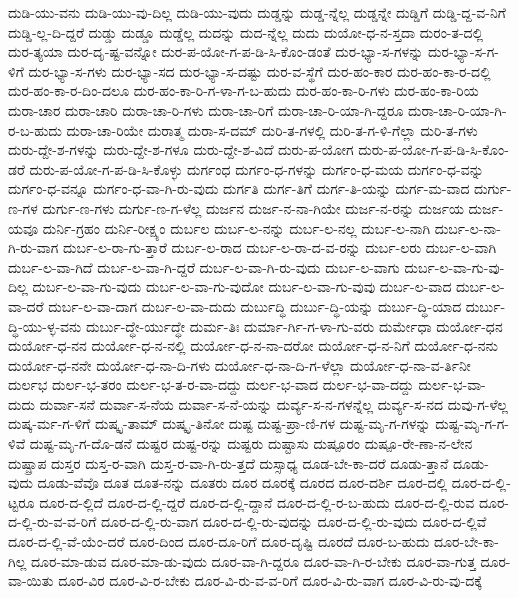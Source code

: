 {ದುಡಿ-ಯು-ವನು
ದುಡಿ-ಯು-ವು-ದಿಲ್ಲ
ದುಡಿ-ಯು-ವುದು
ದುಡ್ಡನ್ನು
ದುಡ್ಡ-ನ್ನೆಲ್ಲ
ದುಡ್ಡನ್ನೇ
ದುಡ್ಡಿಗೆ
ದುಡ್ಡಿ-ದ್ದ-ವ-ನಿಗೆ
ದುಡ್ಡಿ-ಲ್ಲ-ದಿ-ದ್ದರೆ
ದುಡ್ಡು
ದುಡ್ಡೂ
ದುಡ್ಡೆಲ್ಲ
ದುದನ್ನು
ದುದ-ನ್ನೆಲ್ಲ
ದುದು
ದುಯೋ-ಧ-ನ-ಸ್ತದಾ
ದುರಂ-ತ-ದಲ್ಲಿ
ದುರ-ತ್ಯಯಾ
ದುರ-ದೃ-ಷ್ಟ-ವನ್ನೋ
ದುರ-ಪ-ಯೋ-ಗ-ಪ-ಡಿ-ಸಿ-ಕೊಂ-ಡಂತೆ
ದುರ-ಭ್ಯಾ-ಸ-ಗಳನ್ನು
ದುರ-ಭ್ಯಾ-ಸ-ಗ-ಳಿಗೆ
ದುರ-ಭ್ಯಾ-ಸ-ಗಳು
ದುರ-ಭ್ಯಾ-ಸದ
ದುರ-ಭ್ಯಾ-ಸ-ದಷ್ಟು
ದುರ-ವ-ಸ್ಥೆಗೆ
ದುರ-ಹಂ-ಕಾರ
ದುರ-ಹಂ-ಕಾ-ರ-ದಲ್ಲಿ
ದುರ-ಹಂ-ಕಾ-ರ-ದಿಂ-ದಲೂ
ದುರ-ಹಂ-ಕಾ-ರಿ-ಗ-ಳಾ-ಗ-ಬ-ಹುದು
ದುರ-ಹಂ-ಕಾ-ರಿ-ಗಳು
ದುರ-ಹಂ-ಕಾ-ರಿಯ
ದುರಾ-ಚಾರ
ದುರಾ-ಚಾರಿ
ದುರಾ-ಚಾ-ರಿ-ಗಳು
ದುರಾ-ಚಾ-ರಿಗೆ
ದುರಾ-ಚಾ-ರಿ-ಯಾ-ಗಿ-ದ್ದರೂ
ದುರಾ-ಚಾ-ರಿ-ಯಾ-ಗಿ-ರ-ಬ-ಹುದು
ದುರಾ-ಚಾ-ರಿಯೇ
ದುರಾತ್ಮ
ದುರಾ-ಸ-ದಮ್
ದುರಿ-ತ-ಗಳಲ್ಲಿ
ದುರಿ-ತ-ಗ-ಳಿ-ಗೆಲ್ಲಾ
ದುರಿ-ತ-ಗಳು
ದುರು-ದ್ದೇ-ಶ-ಗಳನ್ನು
ದುರು-ದ್ದೇ-ಶ-ಗಳೂ
ದುರು-ದ್ದೇ-ಶ-ವಿದೆ
ದುರು-ಪ-ಯೋಗ
ದುರು-ಪ-ಯೋ-ಗ-ಪ-ಡಿ-ಸಿ-ಕೊಂ-ಡರೆ
ದುರು-ಪ-ಯೋ-ಗ-ಪ-ಡಿ-ಸಿ-ಕೊಳ್ಳು
ದುರ್ಗಂಧ
ದುರ್ಗಂ-ಧ-ಗಳನ್ನು
ದುರ್ಗಂ-ಧ-ಮಯ
ದುರ್ಗಂ-ಧ-ವನ್ನು
ದುರ್ಗಂ-ಧ-ವನ್ನೂ
ದುರ್ಗಂ-ಧ-ವಾ-ಗಿ-ರು-ವುದು
ದುರ್ಗತಿ
ದುರ್ಗ-ತಿಗೆ
ದುರ್ಗ-ತಿ-ಯನ್ನು
ದುರ್ಗ-ಮ-ವಾದ
ದುರ್ಗು-ಣ-ಗಳ
ದುರ್ಗು-ಣ-ಗಳು
ದುರ್ಗು-ಣ-ಗ-ಳೆಲ್ಲ
ದುರ್ಜನ
ದುರ್ಜ-ನ-ನಾ-ಗಿಯೇ
ದುರ್ಜ-ನ-ರನ್ನು
ದುರ್ಜಯ
ದುರ್ಜ-ಯವೂ
ದುರ್ನಿ-ಗ್ರಹಂ
ದುರ್ನಿ-ರೀಕ್ಷ್ಯಂ
ದುರ್ಬಲ
ದುರ್ಬ-ಲ-ನನ್ನು
ದುರ್ಬ-ಲ-ನಲ್ಲ
ದುರ್ಬ-ಲ-ನಾಗಿ
ದುರ್ಬ-ಲ-ನಾ-ಗಿ-ರು-ವಾಗ
ದುರ್ಬ-ಲ-ರಾ-ಗು-ತ್ತಾರೆ
ದುರ್ಬ-ಲ-ರಾದ
ದುರ್ಬ-ಲ-ರಾ-ದ-ವ-ರನ್ನು
ದುರ್ಬ-ಲರು
ದುರ್ಬ-ಲ-ವಾಗಿ
ದುರ್ಬ-ಲ-ವಾ-ಗಿದೆ
ದುರ್ಬ-ಲ-ವಾ-ಗಿ-ದ್ದರೆ
ದುರ್ಬ-ಲ-ವಾ-ಗಿ-ರು-ವುದು
ದುರ್ಬ-ಲ-ವಾಗು
ದುರ್ಬ-ಲ-ವಾ-ಗು-ವು-ದಿಲ್ಲ
ದುರ್ಬ-ಲ-ವಾ-ಗು-ವುದು
ದುರ್ಬ-ಲ-ವಾ-ಗು-ವುದೋ
ದುರ್ಬ-ಲ-ವಾ-ಗು-ವುವು
ದುರ್ಬ-ಲ-ವಾದ
ದುರ್ಬ-ಲ-ವಾ-ದರೆ
ದುರ್ಬ-ಲ-ವಾ-ದಾಗ
ದುರ್ಬ-ಲ-ವಾ-ದುದು
ದುರ್ಬುದ್ಧಿ
ದುರ್ಬು-ದ್ಧಿ-ಯನ್ನು
ದುರ್ಬು-ದ್ಧಿ-ಯಾದ
ದುರ್ಬು-ದ್ಧಿ-ಯು-ಳ್ಳ-ವನು
ದುರ್ಬು-ದ್ಧೇ-ರ್ಯುದ್ಧೇ
ದುರ್ಮ-ತಿಃ
ದುರ್ಮಾ-ರ್ಗಿ-ಗ-ಳಾ-ಗು-ವರು
ದುರ್ಮೇಧಾ
ದುರ್ಯೋ-ಧನ
ದುರ್ಯೋ-ಧ-ನನ
ದುರ್ಯೋ-ಧ-ನ-ನಲ್ಲಿ
ದುರ್ಯೋ-ಧ-ನ-ನಾ-ದರೋ
ದುರ್ಯೋ-ಧ-ನ-ನಿಗೆ
ದುರ್ಯೋ-ಧ-ನನು
ದುರ್ಯೋ-ಧ-ನನೇ
ದುರ್ಯೋ-ಧ-ನಾ-ದಿ-ಗಳು
ದುರ್ಯೋ-ಧ-ನಾ-ದಿ-ಗ-ಳೆಲ್ಲಾ
ದುರ್ಯೋ-ಧ-ನಾ-ವ-ರ್ತಿನೀ
ದುರ್ಲಭ
ದುರ್ಲ-ಭ-ತರಂ
ದುರ್ಲ-ಭ-ತ-ರ-ವಾ-ದದ್ದು
ದುರ್ಲ-ಭ-ವಾದ
ದುರ್ಲ-ಭ-ವಾ-ದದ್ದು
ದುರ್ಲ-ಭ-ವಾ-ದುದು
ದುರ್ವಾ-ಸನೆ
ದುರ್ವಾ-ಸ-ನೆಯ
ದುರ್ವಾ-ಸ-ನೆ-ಯನ್ನು
ದುರ್ವ್ಯ-ಸ-ನ-ಗಳನ್ನೆಲ್ಲ
ದುರ್ವ್ಯ-ಸ-ನದ
ದುವು-ಗ-ಳೆಲ್ಲ
ದುಷ್ಕ-ರ್ಮ-ಗ-ಳಿಗೆ
ದುಷ್ಕೃ-ತಾಮ್
ದುಷ್ಕೃ-ತಿನೋ
ದುಷ್ಟ
ದುಷ್ಟ-ಪ್ರಾ-ಣಿ-ಗಳ
ದುಷ್ಟ-ಮೃ-ಗ-ಗಳನ್ನು
ದುಷ್ಟ-ಮೃ-ಗ-ಗ-ಳಿವೆ
ದುಷ್ಟ-ಮೃ-ಗ-ದೊ-ಡನೆ
ದುಷ್ಟರ
ದುಷ್ಟ-ರನ್ನು
ದುಷ್ಟರು
ದುಷ್ಟಾಸು
ದುಷ್ಪೂರಂ
ದುಷ್ಪೂ-ರೇ-ಣಾ-ನ-ಲೇನ
ದುಷ್ಪ್ರಾಪ
ದುಸ್ತರ
ದುಸ್ತ-ರ-ವಾಗಿ
ದುಸ್ತ-ರ-ವಾ-ಗಿ-ರು-ತ್ತದೆ
ದುಸ್ಸಾಧ್ಯ
ದೂಡ-ಬೇ-ಕಾ-ದರೆ
ದೂಡು-ತ್ತಾನೆ
ದೂಡು-ವುದು
ದೂಡು-ವೆವೊ
ದೂತ
ದೂತ-ನನ್ನು
ದೂತರು
ದೂರ
ದೂರಕ್ಕೆ
ದೂರದ
ದೂರ-ದರ್ಶಿ
ದೂರ-ದಲ್ಲಿ
ದೂರ-ದ-ಲ್ಲಿ-ಟ್ಟರೂ
ದೂರ-ದ-ಲ್ಲಿದೆ
ದೂರ-ದ-ಲ್ಲಿ-ದ್ದರೆ
ದೂರ-ದ-ಲ್ಲಿ-ದ್ದಾನೆ
ದೂರ-ದ-ಲ್ಲಿ-ರ-ಬ-ಹುದು
ದೂರ-ದ-ಲ್ಲಿ-ರುವ
ದೂರ-ದ-ಲ್ಲಿ-ರು-ವ-ವ-ರಿಗೆ
ದೂರ-ದ-ಲ್ಲಿ-ರು-ವಾಗ
ದೂರ-ದ-ಲ್ಲಿ-ರು-ವುದನ್ನು
ದೂರ-ದ-ಲ್ಲಿ-ರು-ವುದು
ದೂರ-ದ-ಲ್ಲಿವೆ
ದೂರ-ದ-ಲ್ಲಿ-ವೆ-ಯೆಂ-ದರೆ
ದೂರ-ದಿಂದ
ದೂರ-ದೂ-ರಿಗೆ
ದೂರ-ದೃಷ್ಟಿ
ದೂರದೆ
ದೂರ-ಬ-ಹುದು
ದೂರ-ಬೇ-ಕಾ-ಗಿಲ್ಲ
ದೂರ-ಮಾ-ಡುವ
ದೂರ-ಮಾ-ಡು-ವುದು
ದೂರ-ವಾ-ಗಿ-ದ್ದರೂ
ದೂರ-ವಾ-ಗಿ-ರ-ಬೇಕು
ದೂರ-ವಾ-ಗುತ್ತ
ದೂರ-ವಾ-ಯಿತು
ದೂರ-ವಿರ
ದೂರ-ವಿ-ರ-ಬೇಕು
ದೂರ-ವಿ-ರು-ವ-ವ-ರಿಗೆ
ದೂರ-ವಿ-ರು-ವಾಗ
ದೂರ-ವಿ-ರು-ವು-ದಕ್ಕೆ
}

